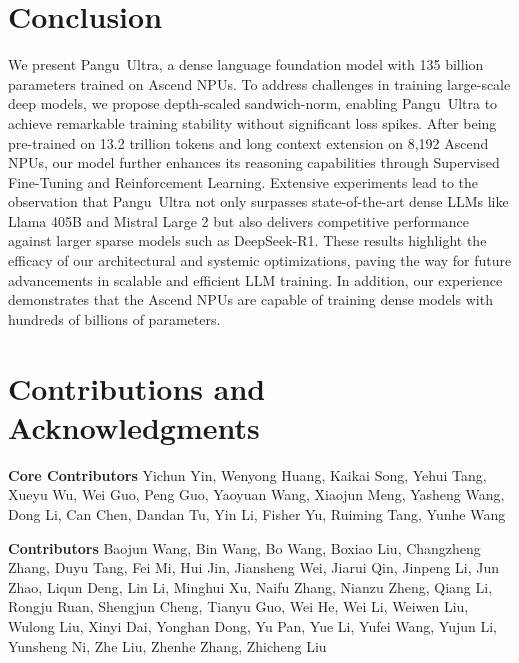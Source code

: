 \documentclass{article}
\newcommand{\pangu}{Pangu}
\newcommand{\modelname}{\pangu~Ultra}
\begin{document}






\section{Conclusion}

We present \modelname{}, a dense language foundation model with 135 billion parameters trained on Ascend NPUs. To address challenges in training large-scale deep models, we propose depth-scaled sandwich-norm, enabling \modelname{} to achieve remarkable training stability without significant loss spikes. After being pre-trained on 13.2 trillion tokens and long context extension on 8,192 Ascend NPUs, our model further enhances its reasoning capabilities through Supervised Fine-Tuning and Reinforcement Learning. Extensive experiments lead to the observation that \modelname{} not only surpasses state-of-the-art dense LLMs like Llama 405B and Mistral Large 2 but also delivers competitive performance against larger sparse models such as DeepSeek-R1. These results highlight the efficacy of our architectural and systemic optimizations, paving the way for future advancements in scalable and efficient LLM training. In addition, our experience demonstrates that the Ascend NPUs are capable of training dense models with hundreds of billions of parameters.




\newpage
\appendix
\section{Contributions and Acknowledgments}



\noindent
\textbf{Core Contributors}
Yichun Yin, Wenyong Huang, Kaikai Song, Yehui Tang, Xueyu Wu, Wei Guo, Peng Guo, Yaoyuan Wang, Xiaojun Meng, Yasheng Wang, Dong Li, Can Chen, Dandan Tu, Yin Li, Fisher Yu, Ruiming Tang, Yunhe Wang

\textbf{Contributors}
Baojun Wang, Bin Wang, Bo Wang, Boxiao Liu, Changzheng Zhang, Duyu Tang, Fei Mi, Hui Jin, Jiansheng Wei, Jiarui Qin, Jinpeng Li, Jun Zhao, Liqun Deng, Lin Li, Minghui Xu, Naifu Zhang, Nianzu Zheng, Qiang Li, Rongju Ruan, Shengjun Cheng, Tianyu Guo, Wei He, Wei Li, Weiwen Liu, Wulong Liu, Xinyi Dai, Yonghan Dong, Yu Pan, Yue Li, Yufei Wang, Yujun Li, Yunsheng Ni, Zhe Liu, Zhenhe Zhang, Zhicheng Liu



\end{document}
